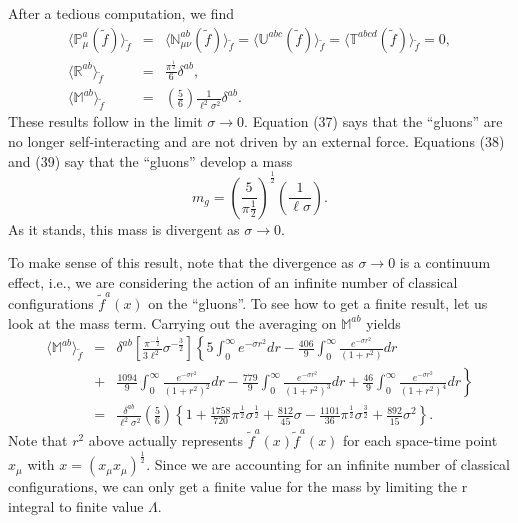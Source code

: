 \documentclass[a4paper,12pt]{article}
\begin{document}
After a tedious computation, we find
\begin{eqnarray}\label{23}
\langle\mathbb{P}^{a}_{\mu}(\tilde{f})\rangle_{\tilde{f}}&=&\langle\mathbb{N}^{ab}_{\mu\nu}(\tilde{f})\rangle_{\tilde{f}}=\langle\mathbb{U}^{abc}(\tilde{f})\rangle_{\tilde{f}}=\langle\mathbb{T}^{abcd}(\tilde{f})\rangle_{\tilde{f}}=0,\\
\langle\mathbb{R}^{ab}\rangle_{\tilde{f}}&=&\frac{\pi^{\frac{1}{2}}}{6}\delta^{ab},\\
\langle\mathbb{M}^{ab}\rangle_{\tilde{f}}&=&(\frac{5}{6})\frac{1}{\ell^{2}\sigma^{2}}\delta^{ab}.
\end{eqnarray}
These results follow in the limit $\sigma\to 0$.  Equation (37) says that the ``gluons'' are no longer self-interacting and are not driven by an external force.  Equations (38) and (39) say that the ``gluons'' develop a mass
\begin{equation}\label{24}
m_{g}=(\frac{5}{\pi\frac{1}{2}})^{\frac{1}{2}}(\frac{1}{\ell\sigma}).
\end{equation}
As it stands, this mass is divergent as $\sigma\to 0$.

To make sense of this result, note that the divergence as $\sigma\to 0$ is a continuum effect, i.e., we are considering the action of an infinite number of classical configurations $\tilde{f}^{a}(x)$ on the ``gluons''.  To see how to get a finite result, let us look at the mass term.  Carrying out the averaging on $\mathbb{M}^{ab}$ yields
\begin{eqnarray}\label{25}
\langle\mathbb{M}^{ab}\rangle_{\tilde{f}} 
& = &\delta^{ab}
   \left[
     \frac{ \pi^{ -\frac{1}{2} } }{ 3\ell^{2} }
     \sigma^{ -\frac{3}{2} }
   \right]
   \left\{ 5\int^{\infty}_{0}e^{-\sigma r^{2} }dr-                                   \frac{406}{9}\int^{\infty}_{0}\frac{ e^{-\sigma r^{2}} }{(1+r^2)}dr
   \right. \nonumber\\
& + &
   \left.
     \frac{1094}{9}\int^{\infty}_{0}\frac{e^{-\sigma r^2}}{(1+r^2)^2}dr -                    \frac{779}{9}\int^{\infty}_{0} \frac{e^{-\sigma r^2}}{(1+r^2)^3}dr +                                         \frac{46}{9}\int^{\infty}_{0}  \frac{e^{-\sigma r^2}}{(1+r^2)^4}dr
   \right\} \nonumber\\
& = &\frac{\delta^{ab}}{\ell^2\sigma^2}(\frac{5}{6})
   \left\{1+\frac{1758}{720}\pi^{\frac{1}{2}}
     \sigma^{\frac{1}{2}}+\frac{812}{45}\sigma-          \frac{1101}{36}\pi^{\frac{1}{2}}\sigma^{\frac{3}{2}}+\frac{892}{15}\sigma^{2}
   \right\}.
\end{eqnarray}
Note that $r^{2}$ above actually represents $\tilde{f}^{a}(x)\tilde{f}^{a}(x)$ for each space-time point $x_{\mu}$ with $x=(x_{\mu}x_{\mu})^{\frac{1}{2}}$.  Since we are accounting for an infinite number of classical configurations, we can only get a finite value for the mass by limiting the r integral to finite value $\Lambda$.
\end{document}
